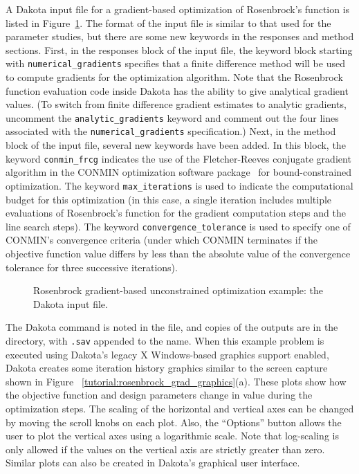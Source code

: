 A Dakota input file for a gradient-based optimization of Rosenbrock's
function is listed in Figure~\ref{tutorial:rosenbrock_grad}. The
format of the input file is similar to that used for the parameter
studies, but there are some new keywords in the responses and method
sections. First, in the responses block of the input file, the
keyword block starting with \texttt{numerical\_gradients} specifies
that a finite difference method will be used to compute gradients for
the optimization algorithm. Note that the Rosenbrock function
evaluation code inside Dakota has the ability to give analytical
gradient values. (To switch from finite difference gradient estimates
to analytic gradients, uncomment the \texttt{analytic\_gradients}
keyword and comment out the four lines associated with the
\texttt{numerical\_gradients} specification.)
Next, in the method
block of the input file, several new keywords have been added. In
this block, the keyword \texttt{conmin\_frcg} indicates the use of
the Fletcher-Reeves conjugate gradient algorithm in the CONMIN
optimization software package~\cite{Van78} for bound-constrained
optimization. The keyword \texttt{max\_iterations} is used to
indicate the computational budget for this optimization (in this case,
a single iteration includes multiple evaluations of Rosenbrock's
function for the gradient computation steps and the line search
steps). The keyword \texttt{convergence\_tolerance} is used to specify
one of CONMIN's convergence criteria (under which CONMIN terminates if the
objective function value differs by less than the absolute value of
the convergence tolerance for three successive iterations).

\begin{figure}
  \centering
  \begin{bigbox}
    \begin{small}
    \end{small}
  \end{bigbox}
  \caption{Rosenbrock gradient-based unconstrained optimization
  example: the Dakota input file.}
  \label{tutorial:rosenbrock_grad}
\end{figure}

The Dakota command is noted in the file, and copies of the outputs are
in the  directory, with \texttt{.sav}
appended to the name.  When this example problem is executed using
Dakota's legacy X Windows-based graphics support enabled, Dakota
creates some iteration history graphics similar to the screen capture
shown in Figure~ \ref{tutorial:rosenbrock_grad_graphics}(a). These
plots show how the objective function and design parameters change in
value during the optimization steps. The scaling of the horizontal and
vertical axes can be changed by moving the scroll knobs on each plot.
Also, the ``Options'' button allows the user to plot the vertical axes
using a logarithmic scale. Note that log-scaling is only allowed if
the values on the vertical axis are strictly greater than zero.
Similar plots can also be created in Dakota's graphical user
interface.

